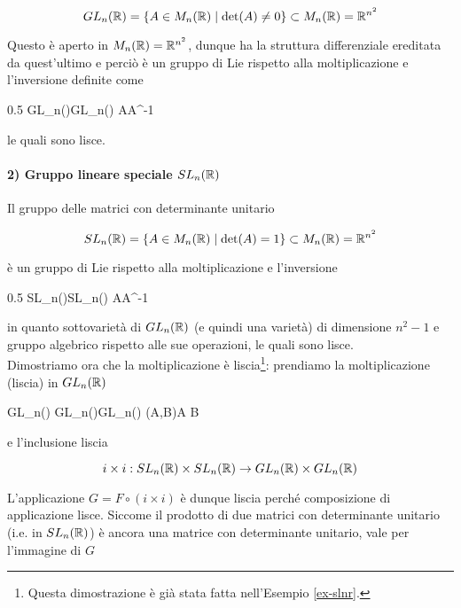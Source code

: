 \begin{equation}
	GL_{n}(\mathbb{R}) = \{ A \in M_{n}(\mathbb{R}) \mid \det(A) \neq 0 \} \subset M_{n}(\mathbb{R}) = \mathbb{R}^{n^{2}}
\end{equation}

Questo è aperto in $ M_{n}(\mathbb{R}) = \mathbb{R}^{n^{2}} $, dunque ha la struttura differenziale ereditata da quest'ultimo e perciò è un gruppo di Lie rispetto alla moltiplicazione e l'inversione definite come

	{0.5}{%
				{GL_{n}(\R)}{GL_{n}(\R)}
				{A}{A^{-1}}
		}

le quali sono lisce.

\paragraph{2) Gruppo lineare speciale $ SL_{n}(\mathbb{R}) $}

Il gruppo delle matrici con determinante unitario

\begin{equation}
	SL_{n}(\mathbb{R}) = \{ A \in M_{n}(\mathbb{R}) \mid \det(A) = 1 \} \subset M_{n}(\mathbb{R}) = \mathbb{R}^{n^{2}}
\end{equation}

è un gruppo di Lie rispetto alla moltiplicazione e l'inversione

	{0.5}{%
				{SL_{n}(\R)}{SL_{n}(\R)}
				{A}{A^{-1}}
			}

in quanto sottovarietà di $ GL_{n}(\mathbb{R}) $ (e quindi una varietà) di dimensione $ n^{2}-1 $ e gruppo algebrico rispetto alle sue operazioni, le quali sono lisce.\\
Dimostriamo ora che la moltiplicazione è liscia\footnote{%
	Questa dimostrazione è già stata fatta nell'Esempio \ref{ex-slnr}.%
}: prendiamo la moltiplicazione (liscia) in $ GL_{n}(\mathbb{R}) $

	{GL_{n}(\R) \times GL_{n}(\R)}{GL_{n}(\R)}
	{(A,B)}{A B}

e l'inclusione liscia

\begin{equation}
	i \times i : SL_{n}(\mathbb{R}) \times SL_{n}(\mathbb{R}) \to GL_{n}(\mathbb{R}) \times GL_{n}(\mathbb{R})
\end{equation}

L'applicazione $ G = F \circ (i \times i) $ è dunque liscia perché composizione di applicazione lisce. Siccome il prodotto di due matrici con determinante unitario (i.e. in $ SL_{n}(\mathbb{R}) $) è ancora una matrice con determinante unitario, vale per l'immagine di $ G $

